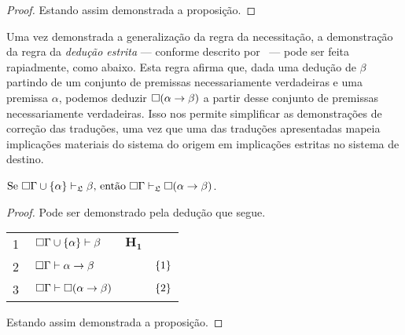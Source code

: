 \begin{tcolorbox}[enhanced jigsaw, breakable, sharp corners, colframe=black, colback=white, boxrule=0.5pt, left=1.5mm, right=1.5mm, top=1.5mm, bottom=1.5mm]
\begin{theorem}
\begin{proof}
            \vspace{0.5\baselineskip}
            Estando assim demonstrada a proposição.
        \end{proof}
    \end{theorem}
    \end{tcolorbox}
    \vspace{.5\baselineskip}
    Uma vez demonstrada a generalização da regra da necessitação, a demonstração da regra da \emph{dedução estrita} --- conforme descrito por~\cite{Barcan, Marcus} --- pode ser feita rapiadmente, como abaixo.
    Esta regra afirma que, dada uma dedução de $\beta$ partindo de um conjunto de premissas necessariamente verdadeiras e uma premissa $\alpha$, podemos deduzir $\Box(\alpha\to\beta)$ a partir desse conjunto de premissas necessariamente verdadeiras.
    Isso nos permite simplificar as demonstrações de correção das traduções, uma vez que uma das traduções apresentadas mapeia implicações materiais do sistema do origem em implicações estritas no sistema de destino.
    \vspace{.5\baselineskip}
    \begin{tcolorbox}[enhanced jigsaw, breakable, sharp corners, colframe=black, colback=white, boxrule=0.5pt, left=1.5mm, right=1.5mm, top=1.5mm, bottom=1.5mm]
    \begin{lemma}\label{strict.deduction}
        $\text{Se }\Box\Gamma\cup\left\{\alpha\right\}\mathrel{\vdash}_{\mathfrak{L}}\beta\text{, então }\Box\Gamma\mathrel{\vdash}_{\mathfrak{L}}\Box(\alpha\to\beta)$.
        \begin{proof}
            Pode ser demonstrado pela dedução que segue.

            \vspace{0.5\baselineskip}
            \footnotesize
            \setlength{\rowskip}{0.5\baselineskip}
            \begin{xltabular}{\textwidth}{r | X l l}
                \scriptsize{\phantom{0}1}\phantom{ } & $\ \nec\Gamma\cup\set{\alpha}\entails\beta$ & $\mathbf{H_1}$\phantom{1} & \\[\rowskip]
                \scriptsize{\phantom{0}2}\phantom{ } & $\ \nec\Gamma\entails\alpha\to\beta$        &       & $\left\{1\right\}$\\[\rowskip]
                \scriptsize{\phantom{0}3}\phantom{ } & $\ \nec\Gamma\entails\nec(\alpha\to\beta)$  &  & $\left\{2\right\}$
            \end{xltabular}
            \normalsize

            \vspace{0.5\baselineskip}
            Estando assim demonstrada a proposição.
        \end{proof}
    \end{lemma}
    \end{tcolorbox}
